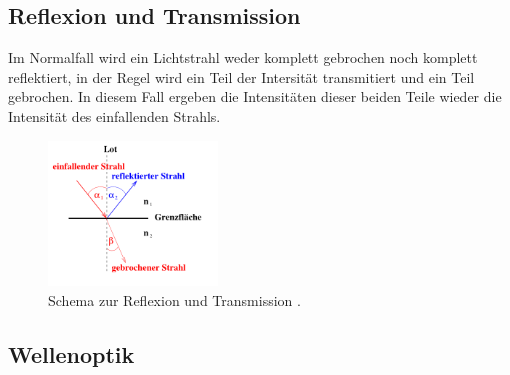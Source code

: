     \subsection{Reflexion und Transmission}

        \noindent Im Normalfall wird ein Lichtstrahl weder komplett gebrochen noch komplett reflektiert, in der Regel wird ein Teil der Intersität transmitiert und ein Teil gebrochen. In diesem Fall ergeben die Intensitäten dieser beiden Teile wieder die Intensität des einfallenden Strahls.

        \begin{figure}[H]
            \centering
            \includegraphics[width=0.4\textwidth]{images/pic4.PNG}
            \caption{Schema zur Reflexion und Transmission \cite{400}.}
            \label{fig:trans}
        \end{figure}

    \subsection{Wellenoptik}
        
